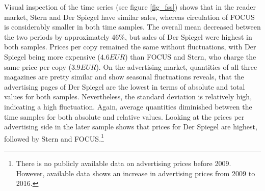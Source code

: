 \documentclass[12pt,a4paper,notitlepage]{article}
\begin{document}
Visual inspection of the time series (see figure \ref{fig_fss}) shows that in the reader market, Stern and Der Spiegel have similar sales, whereas circulation of FOCUS is considerably smaller in both time samples. The overall mean decreased between the two periods by approximately 46$\%$, but sales of Der Spiegel were highest in both samples. Prices per copy remained the same without fluctuations, with Der Spiegel being more expensive ($4.6 EUR$) than FOCUS and Stern, who charge the same price per copy ($3.9 EUR$). On the advertising market, quantities of all three magazines are pretty similar and show seasonal fluctuations reveals, that the advertising pages of Der Spiegel are the lowest in terms of absolute and total values for both samples. Nevertheless, the standard deviation is relatively high, indicating a high fluctuation. Again, average quantities diminished between the time samples for both absolute and relative values. Looking at the prices per advertising side in the later sample shows that prices for Der Spiegel are highest, followed by Stern and FOCUS.\footnote{There is no publicly available data on advertising prices before 2009. However, available data shows an increase in advertising prices from 2009 to 2016.}
\end{document}
